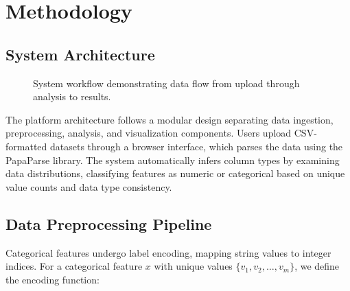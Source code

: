 \documentclass[conference]{IEEEtran}
\begin{document}
\section{Methodology}

\subsection{System Architecture}

\begin{figure}[h]
\centering
{}
\caption{System workflow demonstrating data flow from upload through analysis to results.}
\label{fig:workflow}
\end{figure}

The platform architecture follows a modular design separating data ingestion, preprocessing, analysis, and visualization components. Users upload CSV-formatted datasets through a browser interface, which parses the data using the PapaParse library. The system automatically infers column types by examining data distributions, classifying features as numeric or categorical based on unique value counts and data type consistency.

\subsection{Data Preprocessing Pipeline}

Categorical features undergo label encoding, mapping string values to integer indices. For a categorical feature $x$ with unique values $\{v_1, v_2, \ldots, v_m\}$, we define the encoding function:
\end{document}
